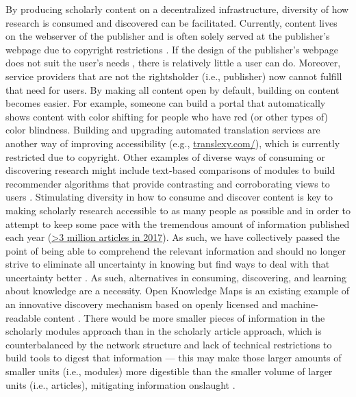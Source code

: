 \documentclass[publications,article,submit,moreauthors,pdftex,10pt,a4paper]{Definitions/mdpi}
\begin{document}
By producing scholarly content on a decentralized infrastructure,
diversity of how research is consumed and discovered can be
facilitated. Currently, content lives on the webserver of the
publisher and is often solely served at the publisher's webpage due to
copyright restrictions \citep[except for open access
  articles;][]{doi:10.7717/peerj.4375}. If the design of the
publisher's webpage does not suit the user's needs \citep[e.g., due to
  red color blindness affecting approximately 1 in 20 males and 1 in
  100 females;][]{doi:10.1016/j.gendis.2015.02.006}, there is
relatively little a user can do. Moreover, service providers that are
not the rightsholder (i.e., publisher) now cannot fulfill that need
for users. By making all content open by default, building on content
becomes easier. For example, someone can build a portal that
automatically shows content with color shifting for people who have
red (or other types of) color blindness. Building and upgrading
automated translation services are another way of improving
accessibility (e.g., \href{http://translexy.com/}{translexy.com/}),
which is currently restricted due to copyright.  Other examples of
diverse ways of consuming or discovering research might include
text-based comparisons of modules to build recommender algorithms that
provide contrasting and corroborating views to users
\citep[e.g.,][]{doi:10.1038/nature.2017.22163}. Stimulating diversity
in how to consume and discover content is key to making scholarly
research accessible to as many people as possible and in order to
attempt to keep some pace with the tremendous amount of information
published each year
(\href{https://api.crossref.org/works?filter=type:journal-article,from-pub-date:2017,until-pub-date:2017\&rows=0}{\textgreater{}3
  million articles in 2017}). As such, we have collectively passed the
point of being able to comprehend the relevant information and should
no longer strive to eliminate all uncertainty in knowing but find ways
to deal with that uncertainty better \citep{isbn:9781786635471}. As
such, alternatives in consuming, discovering, and learning about
knowledge are a necessity. Open Knowledge Maps is an existing example
of an innovative discovery mechanism based on openly licensed and
machine-readable content \citep{doi:10.12685/027.7-4-2-157}. There
would be more smaller pieces of information in the scholarly modules
approach than in the scholarly article approach, which is
counterbalanced by the network structure and lack of technical
restrictions to build tools to digest that information --- this may
make those larger amounts of smaller units (i.e., modules) more
digestible than the smaller volume of larger units (i.e., articles),
mitigating information onslaught
\citep{doi:10.1080/1047840X.2012.701161}.
\end{document}
